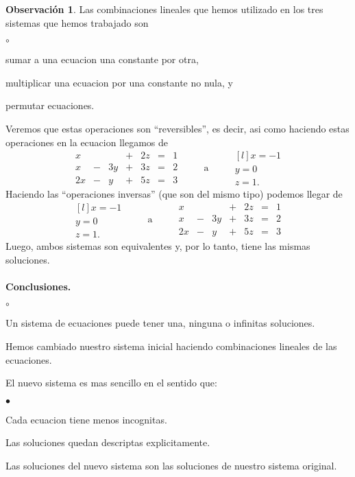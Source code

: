\documentclass{article}
\theoremstyle{definition}
\theoremstyle{definition}
\newtheorem*{obs}{Observación}
\theoremstyle{remark}
\begin{document}
\begin{obs}
  Las combinaciones lineales que hemos utilizado en los tres sistemas que hemos trabajado son
\begin{list}{$\circ$}{}  
\item sumar a una ecuacion una constante por otra,  
\item multiplicar una ecuacion por una constante no nula, y 
\item permutar ecuaciones. 
\end{list}
\end{obs}
Veremos que estas operaciones son ``reversibles'', es decir, asi como haciendo estas operaciones en la ecuacion llegamos de \[
  \begin{matrix}
    x & & & + & 2z & = & 1 \\
    x & - & 3y & + & 3z & = &2 \\
    2x & - & y & + & 5z & = & 3
  \end{matrix}\quad \quad \text { a } \quad \quad 
  \begin{matrix}[l]
x=-1\\
y=0\\
z=1.
  \end{matrix}
\]
Haciendo las ``operaciones inversas'' (que son del mismo tipo) podemos llegar de \[
 \begin{matrix}[l]
x=-1\\
y=0\\
z=1.
  \end{matrix}
\quad \quad \text { a } \quad \quad 
  \begin{matrix}
    x & & & + & 2z & = & 1 \\
    x & - & 3y & + & 3z & = &2 \\
    2x & - & y & + & 5z & = & 3
  \end{matrix} 
\]
Luego, ambos sistemas son equivalentes y, por lo tanto, tiene las mismas soluciones.
\\\\
\textbf{Conclusiones.}
\begin{list}{$\circ$}{}  
\item  Un sistema de ecuaciones puede tener una, ninguna o infinitas soluciones.
\item  Hemos cambiado nuestro sistema inicial haciendo combinaciones lineales de las ecuaciones.
\item El nuevo sistema es mas sencillo en el sentido que: 
  \begin{list}{$\bullet$}{}
  \item Cada ecuacion tiene menos incognitas. 
  \item Las soluciones quedan descriptas explicitamente.
  \end{list}
\item Las soluciones del nuevo sistema son las soluciones de nuestro sistema original.
\end{list}
\end{document}

